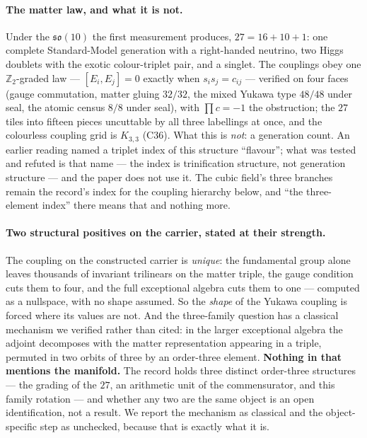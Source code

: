 \documentclass[11pt,a4paper]{article}
\theoremstyle{definition}
\theoremstyle{remark}
\newcommand{\Z}{\mathbb{Z}}
\begin{document}
\paragraph{The matter law, and what it is not.} Under the $\mathfrak{so}(10)$ the first measurement produces, $27 = 16 + 10
+ 1$: one complete Standard-Model generation with a right-handed neutrino, two Higgs doublets with the exotic colour-triplet
pair, and a singlet. The couplings obey one $\Z_2$-graded law --- $[E_i, E_j] = 0$ exactly when $s_i s_j = c_{ij}$ ---
verified on four faces (gauge commutation, matter gluing $32/32$, the mixed Yukawa type $48/48$ under seal, the atomic census
$8/8$ under seal), with $\prod c = -1$ the obstruction; the $27$ tiles into fifteen pieces uncuttable by all three
labellings at once, and the colourless coupling grid is $K_{3,3}$ (C36). What this is \emph{not}: a generation count.
An earlier reading named a triplet index of this structure ``flavour''; what was tested and refuted is that name --- the index is
trinification structure, not generation structure --- and the paper does not use it. The cubic field's three branches remain the
record's index for the coupling hierarchy below, and ``the three-element index'' there means that and nothing more.

\paragraph{Two structural positives on the carrier, stated at their strength.} The coupling on the constructed
carrier is \emph{unique}: the fundamental group alone leaves thousands of invariant trilinears on the matter
triple, the gauge condition cuts them to four, and the full exceptional algebra cuts them to one --- computed as a
nullspace, with no shape assumed. So the \emph{shape} of the Yukawa coupling is forced where its values are not.
And the three-family question has a classical mechanism we verified rather than cited: in the larger exceptional
algebra the adjoint decomposes with the matter representation appearing in a triple, permuted in two orbits of
three by an order-three element. \textbf{Nothing in that mentions the manifold.} The record holds three distinct
order-three structures --- the grading of the $27$, an arithmetic unit of the commensurator, and this family
rotation --- and whether any two are the same object is an open identification, not a result. We report the
mechanism as classical and the object-specific step as unchecked, because that is exactly what it is.
\end{document}
